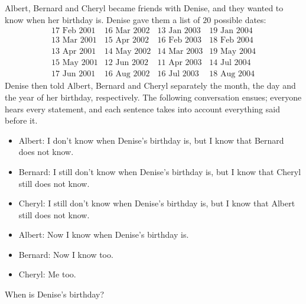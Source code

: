 Albert, Bernard and Cheryl became friends with Denise, and they wanted to know when her birthday is. Denise gave them a list of $20$ possible dates:
\[\begin{array}{llll}
\text{17 Feb 2001} & \text{16 Mar 2002} & \text{13 Jan 2003} & \text{19 Jan 2004}\\
\text{13 Mar 2001} & \text{15 Apr 2002} & \text{16 Feb 2003} & \text{18 Feb 2004}\\
\text{13 Apr 2001} & \text{14 May 2002} & \text{14 Mar 2003} & \text{19 May 2004}\\
\text{15 May 2001} & \text{12 Jun 2002} & \text{11 Apr 2003} & \text{14 Jul 2004}\\
\text{17 Jun 2001} & \text{16 Aug 2002} & \text{16 Jul 2003} & \text{18 Aug 2004}
\end{array}\]
Denise then told Albert, Bernard and Cheryl separately the month, the day and the year of her birthday, respectively. The following conversation ensues; everyone hears every statement, and each sentence takes into account everything said before it.
\begin{itemize}
\item Albert: I don't know when Denise's birthday is, but I know that Bernard does not know.
\item Bernard: I still don't know when Denise's birthday is, but I know that Cheryl still does not know.
\item Cheryl: I still don't know when Denise's birthday is, but I know that Albert still does not know.
\item Albert: Now I know when Denise's birthday is.
\item Bernard: Now I know too.
\item Cheryl: Me too.
\end{itemize}
When is Denise's birthday?

